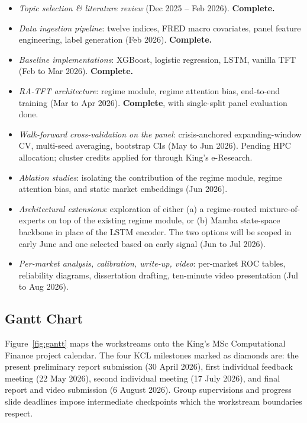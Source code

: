 \documentclass[11pt,a4paper]{article}
\begin{document}
\begin{itemize}
\item[\textbf{W1.}] \emph{Topic selection \& literature review} (Dec 2025
-- Feb 2026). \textbf{Complete.}
\item[\textbf{W2.}] \emph{Data ingestion pipeline}: twelve indices, FRED
macro covariates, panel feature engineering, label generation
(Feb 2026). \textbf{Complete.}
\item[\textbf{W3.}] \emph{Baseline implementations}: XGBoost, logistic
regression, LSTM, vanilla TFT (Feb to Mar 2026). \textbf{Complete.}
\item[\textbf{W4.}] \emph{RA-TFT architecture}: regime module, regime
attention bias, end-to-end training (Mar to Apr 2026). \textbf{Complete}, with
single-split panel evaluation done.
\item[\textbf{W5.}] \emph{Walk-forward cross-validation on the panel}:
crisis-anchored expanding-window CV, multi-seed averaging, bootstrap CIs
(May to Jun 2026). Pending HPC allocation; cluster credits applied for
through King's e-Research.
\item[\textbf{W6.}] \emph{Ablation studies}: isolating the contribution
of the regime module, regime attention bias, and static market embeddings
(Jun 2026).
\item[\textbf{W7.}] \emph{Architectural extensions}: exploration of
either (a) a regime-routed mixture-of-experts on top of the existing regime
module, or (b) Mamba state-space backbone in place of the LSTM encoder. The
two options will be scoped in early June and one selected based on early
signal (Jun to Jul 2026).
\item[\textbf{W8.}] \emph{Per-market analysis, calibration, write-up,
video}: per-market ROC tables, reliability diagrams, dissertation
drafting, ten-minute video presentation (Jul to Aug 2026).
\end{itemize}

\subsection{Gantt Chart}
Figure~\ref{fig:gantt} maps the workstreams onto the King's MSc
Computational Finance project calendar. The four KCL milestones marked as
diamonds are: the present preliminary report submission (30 April 2026),
first individual feedback meeting (22 May 2026), second individual meeting
(17 July 2026), and final report and video submission (6 August 2026).
Group supervisions and progress slide deadlines impose intermediate
checkpoints which the workstream boundaries respect.
\end{document}
